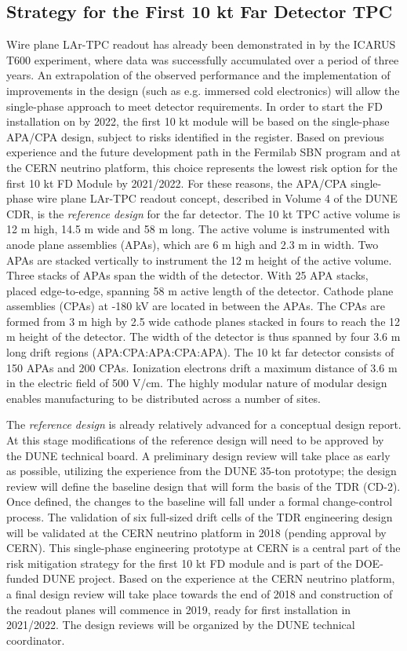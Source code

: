 \subsection{Strategy for the First 10 kt Far Detector TPC}
Wire plane LAr-TPC readout has already been demonstrated in by the ICARUS T600 
experiment, where data was successfully accumulated over a period of three years. 
An extrapolation of the observed performance and the implementation of improvements 
in the design (such as e.g. immersed cold electronics) will allow the single-phase 
approach to meet detector requirements. In order to start the FD installation on 
by 2022, the first 10 kt module will be based on the single-phase APA/CPA design, 
subject to risks identified in the register. Based on previous experience and the 
future development path in the Fermilab SBN program and at the CERN neutrino platform, 
this choice represents the lowest risk option for the first 10 kt FD Module by 
2021/2022. For these reasons, the APA/CPA single-phase wire plane LAr-TPC readout 
concept, described in Volume 4 of the DUNE CDR, is the \textit{reference design} 
for the far detector. The 10 kt TPC active volume is 12 m high, 14.5 m wide and 
58 m long. The active volume is instrumented with anode plane assemblies (APAs), 
which are 6 m high and 2.3 m in width. Two APAs are stacked vertically to instrument 
the 12 m height of the active volume. Three stacks of APAs span the width of the 
detector. With 25 APA stacks, placed edge-to-edge, spanning 58 m active length 
of the detector. Cathode plane assemblies (CPAs) at -180 kV are located in between 
the APAs. The CPAs are formed from 3 m high by 2.5 wide cathode planes stacked 
in fours to reach the 12 m height of the detector.  The width of the detector is 
thus spanned by four 3.6 m long drift regions (APA:CPA:APA:CPA:APA). The 10 kt 
far detector consists of 150 APAs and 200 CPAs. Ionization electrons drift a maximum 
distance of 3.6 m in the electric field of 500 V/cm. The highly modular nature 
of modular design enables manufacturing to be distributed across a number of sites.

The \textit{reference design} is already relatively advanced for a conceptual design 
report. At this stage modifications of the reference design will need to be approved 
by the DUNE technical board. A preliminary design review will take place as early 
as possible, utilizing the experience from the DUNE 35-ton prototype; the design 
review will define the baseline design that will form the basis of the TDR (CD-2). 
Once defined, the changes to the baseline will fall under a formal change-control 
process. The validation of six full-sized drift cells of the TDR engineering design 
will be validated at the CERN neutrino platform in 2018 (pending approval by CERN). 
This single-phase engineering prototype at CERN is a central part of the risk mitigation 
strategy for the first 10 kt FD module and is part of the DOE-funded DUNE project. 
Based on the experience at the CERN neutrino platform, a final design review will 
take place towards the end of 2018 and construction of the readout planes will 
commence in 2019, ready for first installation in 2021/2022. The design reviews 
will be organized by the DUNE technical coordinator.

